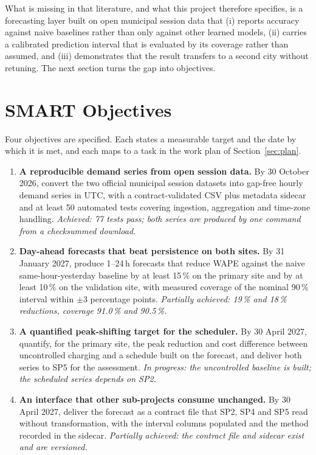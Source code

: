 \documentclass[10pt,a4paper]{article}
\begin{document}
What is missing in that literature, and what this project therefore specifies, is a forecasting
layer built on open municipal session data that (i) reports accuracy against naive baselines
rather than only against other learned models, (ii) carries a calibrated prediction interval that
is evaluated by its coverage rather than assumed, and (iii) demonstrates that the result transfers
to a second city without retuning. The next section turns the gap into objectives.

\section{SMART Objectives}

Four objectives are specified. Each states a measurable target and the date by which it is met, and
each maps to a task in the work plan of Section~\ref{sec:plan}.

\begin{enumerate}[label=O\arabic*.]
  \item \textbf{A reproducible demand series from open session data.} By 30 October 2026, convert
        the two official municipal session datasets into gap-free hourly demand series in UTC, with
        a contract-validated CSV plus metadata sidecar and at least 50 automated tests covering
        ingestion, aggregation and time-zone handling. \emph{Achieved: 77 tests pass; both series
        are produced by one command from a checksummed download.}
  \item \textbf{Day-ahead forecasts that beat persistence on both sites.} By 31 January 2027,
        produce 1--24\,h forecasts that reduce WAPE against the naive same-hour-yesterday baseline
        by at least 15\,\% on the primary site and by at least 10\,\% on the validation site, with
        measured coverage of the nominal 90\,\% interval within $\pm$3 percentage points.
        \emph{Partially achieved: 19\,\% and 18\,\% reductions, coverage 91.0\,\% and 90.5\,\%.}
  \item \textbf{A quantified peak-shifting target for the scheduler.} By 30 April 2027, quantify,
        for the primary site, the peak reduction and cost difference between uncontrolled charging
        and a schedule built on the forecast, and deliver both series to SP5 for the assessment.
        \emph{In progress: the uncontrolled baseline is built; the scheduled series depends on SP2.}
  \item \textbf{An interface that other sub-projects consume unchanged.} By 30 April 2027, deliver
        the forecast as a contract file that SP2, SP4 and SP5 read without transformation, with the
        interval columns populated and the method recorded in the sidecar.
        \emph{Partially achieved: the contract file and sidecar exist and are versioned.}
\end{enumerate}
\end{document}
